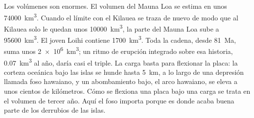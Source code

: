 Los volúmenes son enormes. El volumen del Mauna Loa se estima en unos \qty{74000}{km^3}. Cuando el límite con el Kilauea se traza de nuevo de modo que al Kilauea solo le quedan unos
\qty{10000}{km^3}, la parte del Mauna Loa sube a \qty{95600}{km^3}. El joven Loihi contiene
\qty{1700}{km^3}. Toda la cadena, desde \qty{81}{Ma}, suma unos
\qty{2e6}{km^3}; un ritmo de erupción integrado sobre esa historia, \qty{0.07}{km^3} al año, daría casi el triple. La carga basta para flexionar la
placa: la corteza oceánica bajo las islas se hunde hasta \qty{5}{km}, a lo largo de una
depresión llamada foso hawaiano, y un abombamiento bajo, el arco hawaiano, se eleva a unos cientos de
kilómetros. Cómo se flexiona una placa bajo una carga se trata en el volumen de tercer año. Aquí el foso
importa porque es donde acaba buena parte de los derrubios de las islas.

